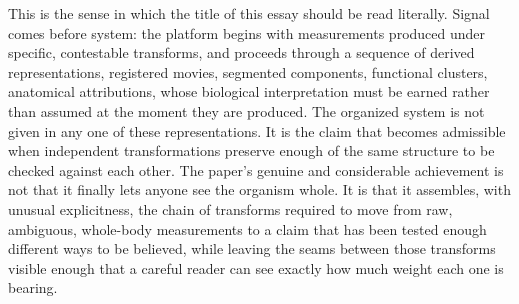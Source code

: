 \documentclass[11pt]{article}
\begin{document}
This is the sense in which the title of this essay should be read literally. Signal comes before system: the platform begins with measurements produced under specific, contestable transforms, and proceeds through a sequence of derived representations, registered movies, segmented components, functional clusters, anatomical attributions, whose biological interpretation must be earned rather than assumed at the moment they are produced. The organized system is not given in any one of these representations. It is the claim that becomes admissible when independent transformations preserve enough of the same structure to be checked against each other. The paper's genuine and considerable achievement is not that it finally lets anyone see the organism whole. It is that it assembles, with unusual explicitness, the chain of transforms required to move from raw, ambiguous, whole-body measurements to a claim that has been tested enough different ways to be believed, while leaving the seams between those transforms visible enough that a careful reader can see exactly how much weight each one is bearing.
\end{document}
